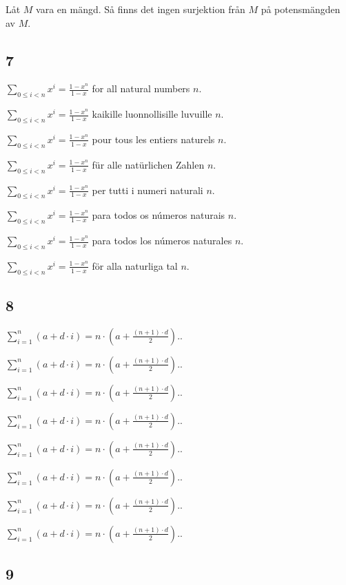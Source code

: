 \documentclass{article}
\newcommand{\sumgeom}[2]{\sum_{0 \leq i < #2} {#1}^i}
\newcommand{\sumarith}[3]{\sum_{i = 1}^{#3}(#1 + #2 \cdot i)}
\begin{document}
Låt $ M $ vara en mängd. Så finns det ingen surjektion från $ M $ på potensmängden av $ M $.

\subsection*{7}

$ \sumgeom{x}{n} = \frac{1 - x^{n}}{1 - x} $ for all natural numbers $ n $.

$ \sumgeom{x}{n} = \frac{1 - x^{n}}{1 - x} $ kaikille luonnollisille luvuille $ n $.

$ \sumgeom{x}{n} = \frac{1 - x^{n}}{1 - x} $ pour tous les entiers naturels $ n $.

$ \sumgeom{x}{n} = \frac{1 - x^{n}}{1 - x} $ für alle natürlichen Zahlen $ n $.

$ \sumgeom{x}{n} = \frac{1 - x^{n}}{1 - x} $ per tutti i numeri naturali $ n $.

$ \sumgeom{x}{n} = \frac{1 - x^{n}}{1 - x} $ para todos os números naturais $ n $.

$ \sumgeom{x}{n} = \frac{1 - x^{n}}{1 - x} $ para todos los números naturales $ n $.

$ \sumgeom{x}{n} = \frac{1 - x^{n}}{1 - x} $ för alla naturliga tal $ n $.

\subsection*{8}

$ \sumarith{a}{d}{n} = n \cdot ( a + \frac{(n + 1) \cdot d}{2}). $.

$ \sumarith{a}{d}{n} = n \cdot ( a + \frac{(n + 1) \cdot d}{2}). $.

$ \sumarith{a}{d}{n} = n \cdot ( a + \frac{(n + 1) \cdot d}{2}). $.

$ \sumarith{a}{d}{n} = n \cdot ( a + \frac{(n + 1) \cdot d}{2}). $.

$ \sumarith{a}{d}{n} = n \cdot ( a + \frac{(n + 1) \cdot d}{2}). $.

$ \sumarith{a}{d}{n} = n \cdot ( a + \frac{(n + 1) \cdot d}{2}). $.

$ \sumarith{a}{d}{n} = n \cdot ( a + \frac{(n + 1) \cdot d}{2}). $.

$ \sumarith{a}{d}{n} = n \cdot ( a + \frac{(n + 1) \cdot d}{2}). $.

\subsection*{9}
\end{document}
